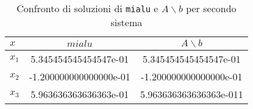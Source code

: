 \FloatBarrier
\begin{table}[ht]
   \centering
   \renewcommand\arraystretch{2}
   \begin{tabular}{| l | c c |}
      \hline
      $x$     & $mialu$                & $A \backslash b$       \\
      \hline
      $x_{1}$ & 5.345454545454547e-01  & 5.345454545454547e-01  \\
      $x_{2}$ & -1.200000000000000e-01 & -1.200000000000000e-01 \\
      $x_{3}$ & 5.963636363636363e-01  & 5.963636363636363e-011 \\
      \hline
   \end{tabular}
   \caption{Confronto di soluzioni di \lstinline{mialu} e $A \backslash b$ per secondo sistema}
   \label{tab:8_2}
\end{table}
\FloatBarrier
